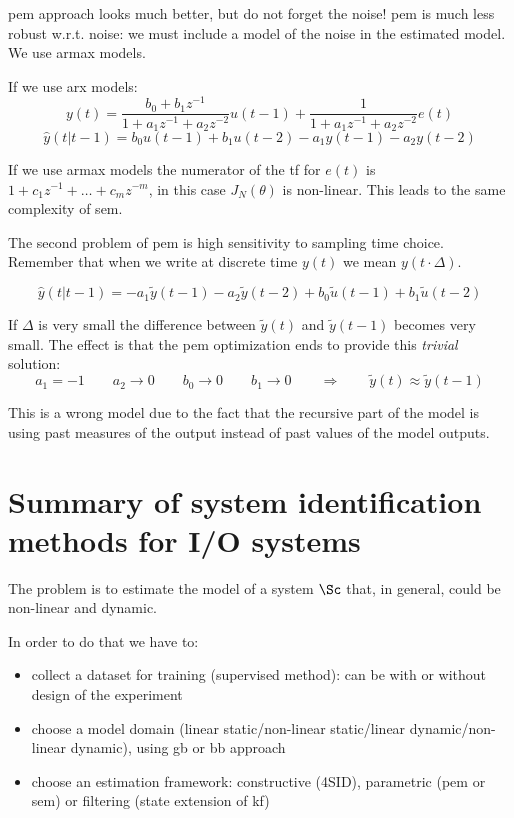 \gls{pem} approach looks much better, but do not forget the noise! \gls{pem} is much less robust w.r.t. noise: we must include a model of the noise in the estimated model.
We use \gls{armax} models.

If we use \gls{arx} models:
\[
    y(t) = \frac{b_0+b_1z^{-1}}{1+a_1z^{-1}+a_2z^{-2}}u(t-1) + \frac{1}{1+a_1z^{-1}+a_2z^{-2}}e(t)
\]
\[
    \hat{y}(t|t-1) = b_0u(t-1)+b_1u(t-2) - a_1y(t-1)-a_2y(t-2)
\]

If we use \gls{armax} models the numerator of the \gls{tf} for $e(t)$ is $1+c_1z^{-1}+\ldots+c_mz^{-m}$, in this case $J_N(\theta)$ is non-linear.
This leads to the same complexity of \gls{sem}.

The second problem of \gls{pem} is high sensitivity to sampling time choice.
Remember that when we write at discrete time $y(t)$ we mean $y(t\cdot \Delta)$.

\[
    \hat{y}(t|t-1) = -a_1\tilde{y}(t-1)-a_2\tilde{y}(t-2) + b_0\tilde{u}(t-1)+b_1\tilde{u}(t-2)
\]

If $\Delta$ is very small the difference between $\tilde{y}(t)$ and $\tilde{y}(t-1)$ becomes very small.
The effect is that the \gls{pem} optimization ends to provide this \emph{trivial} solution:
\[
    a_1 = -1 \qquad a_2 \rightarrow 0 \qquad b_0 \rightarrow 0 \qquad b_1 \rightarrow 0 \qquad \Rightarrow \qquad \tilde{y}(t) \approx \tilde{y}(t-1)
\]

This is a wrong model due to the fact that the recursive part of the model is using past measures of the output instead of past values of the model outputs.

\section{Summary of system identification methods for I/O systems}

The problem is to estimate the model of a system $\Sc$ that, in general, could be non-linear and dynamic.
\begin{figure}[H]
    \centering
\end{figure}

In order to do that we have to:
\begin{itemize}
    \item collect a dataset for training (supervised method): can be with or without design of the experiment
    \item choose a model domain (linear static/non-linear static/linear dynamic/non-linear dynamic), using \gls{gb} or \gls{bb} approach
    \item choose an estimation framework: constructive (4SID), parametric (\gls{pem} or \gls{sem}) or filtering (state extension of \gls{kf})
\end{itemize}

